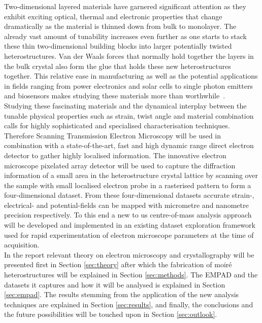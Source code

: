 Two-dimensional layered materials have garnered significant attention as they exhibit exciting optical, thermal and electronic properties that change dramatically as the material is thinned down from bulk to monolayer. The already vast amount of tunability increases even further as one starts to stack these thin two-dimensional building blocks into larger potentially twisted heterostructures. Van der Waals forces that normally hold together the layers in the bulk crystal also form the glue that holds these new heterostructures together. This relative ease in manufacturing as well as the potential applications in fields ranging from power electronics and solar cells to single photon emitters and biosensors makes studying these materials more than worthwhile~\cite{LI2016322, https://doi.org/10.1002/smll.202107059}.\\
Studying these fascinating materials and the dynamical interplay between the tunable physical properties such as strain, twist angle and material combination calls for highly sophisticated and specialised characterisation techniques. Therefore Scanning Transmission Electron Microscopy will be used in combination with a state-of-the-art, fast and high dynamic range direct electron detector to gather highly localised information. The innovative electron microscope pixelated array detector will be used to capture the diffraction information of a small area in the heterostructure crystal lattice by scanning over the sample with small localised electron probe in a rasterised pattern to form a four-dimensional dataset. From these four-dimensional datasets accurate strain-, electrical- and potential-fields can be mapped with  micrometre and nanometre precision respectively. To this end a new to us centre-of-mass analysis approach will be developed and implemented in an existing dataset exploration framework used for rapid experimentation of electron microscope parameters at the time of acquisition.\\
In the report relevant theory on electron microscopy and crystallography will be presented first in Section \ref{sec:theory} after which the fabrication of moiré heterostructures will be explained in Section \ref{sec:methods}. The EMPAD and the datasets it captures and how it will be analysed is explained in Section \ref{sec:empad}. The results stemming from the application of the new analysis techniques are explained in Section \ref{sec:results}, and finally, the conclusions and the future possibilities will be touched upon in Section \ref{sec:outlook}.

